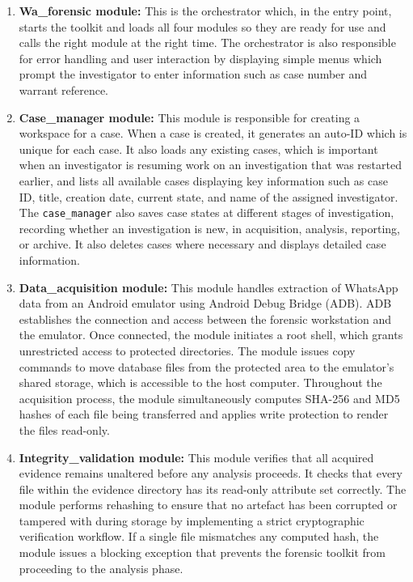 \documentclass[12pt,a4paper]{report}
\begin{document}
\begin{enumerate}
    \item \textbf{Wa\_forensic module:} This is the orchestrator which, in the entry point, starts the toolkit and loads all four modules so they are ready for use and calls the right module at the right time. The orchestrator is also responsible for error handling and user interaction by displaying simple menus which prompt the investigator to enter information such as case number and warrant reference.

    \item \textbf{Case\_manager module:} This module is responsible for creating a workspace for a case. When a case is created, it generates an auto-ID which is unique for each case. It also loads any existing cases, which is important when an investigator is resuming work on an investigation that was restarted earlier, and lists all available cases displaying key information such as case ID, title, creation date, current state, and name of the assigned investigator. The \texttt{case\_manager} also saves case states at different stages of investigation, recording whether an investigation is new, in acquisition, analysis, reporting, or archive. It also deletes cases where necessary and displays detailed case information.

    \item \textbf{Data\_acquisition module:} This module handles extraction of WhatsApp data from an Android emulator using Android Debug Bridge (ADB). ADB establishes the connection and access between the forensic workstation and the emulator. Once connected, the module initiates a root shell, which grants unrestricted access to protected directories. The module issues copy commands to move database files from the protected area to the emulator's shared storage, which is accessible to the host computer. Throughout the acquisition process, the module simultaneously computes SHA-256 and MD5 hashes of each file being transferred and applies write protection to render the files read-only.

    \item \textbf{Integrity\_validation module:} This module verifies that all acquired evidence remains unaltered before any analysis proceeds. It checks that every file within the evidence directory has its read-only attribute set correctly. The module performs rehashing to ensure that no artefact has been corrupted or tampered with during storage by implementing a strict cryptographic verification workflow. If a single file mismatches any computed hash, the module issues a blocking exception that prevents the forensic toolkit from proceeding to the analysis phase.


\end{enumerate}
\end{document}
